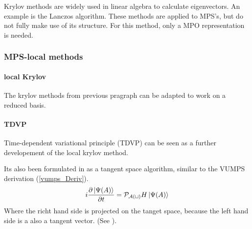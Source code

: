 Krylov methods are widely used in linear algebra to calculate eigenvectors. An example is the Lanczos algorithm. These methods are applied to MPS's, but do not fully make use of its structure. For this method, only a MPO representation is needed.


\subsubsection{MPS-local methods }

\paragraph{local Krylov}
The krylov methods from previous pragraph can be adapted to work on a reduced basis.

\paragraph{TDVP} Time-dependent variational principle (TDVP) can be seen as a further developement of the local krylov method.

Its also been formulated in as a tangent space algorithm, similar to the VUMPS derivation (\cref{vumps_Deriv}).
\begin{equation}
    i \frac{\partial \ket{ \Psi( A ) }}{\partial t} = \mathcal{P_{ A( t )} } H  \ket{ \Psi( A ) }
\end{equation}
Where the richt hand side is projected on the tanget space, because the left hand side is a also a tangent vector. (See \cite{Vanderstraeten2019}).

